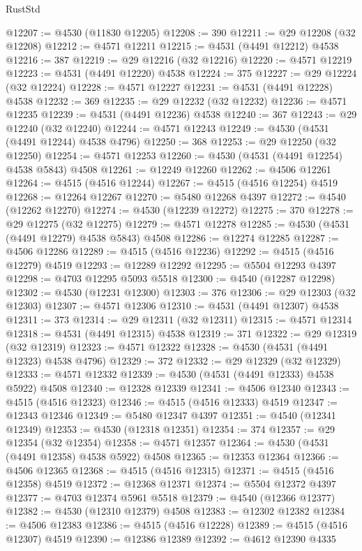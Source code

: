\begin{lexlean}{RustStd}
\begin{coremodule}
@12207 := @4530 (@11830 @12205)
@12208 := 390
@12211 := @29 @12208 (@32 @12208)
@12212 := @4571 @12211
@12215 := @4531 (@4491 @12212) @4538
@12216 := 387
@12219 := @29 @12216 (@32 @12216)
@12220 := @4571 @12219
@12223 := @4531 (@4491 @12220) @4538
@12224 := 375
@12227 := @29 @12224 (@32 @12224)
@12228 := @4571 @12227
@12231 := @4531 (@4491 @12228) @4538
@12232 := 369
@12235 := @29 @12232 (@32 @12232)
@12236 := @4571 @12235
@12239 := @4531 (@4491 @12236) @4538
@12240 := 367
@12243 := @29 @12240 (@32 @12240)
@12244 := @4571 @12243
@12249 := @4530 (@4531 (@4491 @12244) @4538 @4796)
@12250 := 368
@12253 := @29 @12250 (@32 @12250)
@12254 := @4571 @12253
@12260 := @4530 (@4531 (@4491 @12254) @4538 @5843) @4508
@12261 := @12249 @12260
@12262 := @4506 @12261
@12264 := @4515 (@4516 @12244)
@12267 := @4515 (@4516 @12254) @4519
@12268 := @12264 @12267
@12270 := @5480 @12268 @4397
@12272 := @4540 (@12262 @12270)
@12274 := @4530 (@12239 @12272)
@12275 := 370
@12278 := @29 @12275 (@32 @12275)
@12279 := @4571 @12278
@12285 := @4530 (@4531 (@4491 @12279) @4538 @5843) @4508
@12286 := @12274 @12285
@12287 := @4506 @12286
@12289 := @4515 (@4516 @12236)
@12292 := @4515 (@4516 @12279) @4519
@12293 := @12289 @12292
@12295 := @5504 @12293 @4397
@12298 := @4703 @12295 @5093 @5518
@12300 := @4540 (@12287 @12298)
@12302 := @4530 (@12231 @12300)
@12303 := 376
@12306 := @29 @12303 (@32 @12303)
@12307 := @4571 @12306
@12310 := @4531 (@4491 @12307) @4538
@12311 := 373
@12314 := @29 @12311 (@32 @12311)
@12315 := @4571 @12314
@12318 := @4531 (@4491 @12315) @4538
@12319 := 371
@12322 := @29 @12319 (@32 @12319)
@12323 := @4571 @12322
@12328 := @4530 (@4531 (@4491 @12323) @4538 @4796)
@12329 := 372
@12332 := @29 @12329 (@32 @12329)
@12333 := @4571 @12332
@12339 := @4530 (@4531 (@4491 @12333) @4538 @5922) @4508
@12340 := @12328 @12339
@12341 := @4506 @12340
@12343 := @4515 (@4516 @12323)
@12346 := @4515 (@4516 @12333) @4519
@12347 := @12343 @12346
@12349 := @5480 @12347 @4397
@12351 := @4540 (@12341 @12349)
@12353 := @4530 (@12318 @12351)
@12354 := 374
@12357 := @29 @12354 (@32 @12354)
@12358 := @4571 @12357
@12364 := @4530 (@4531 (@4491 @12358) @4538 @5922) @4508
@12365 := @12353 @12364
@12366 := @4506 @12365
@12368 := @4515 (@4516 @12315)
@12371 := @4515 (@4516 @12358) @4519
@12372 := @12368 @12371
@12374 := @5504 @12372 @4397
@12377 := @4703 @12374 @5961 @5518
@12379 := @4540 (@12366 @12377)
@12382 := @4530 (@12310 @12379) @4508
@12383 := @12302 @12382
@12384 := @4506 @12383
@12386 := @4515 (@4516 @12228)
@12389 := @4515 (@4516 @12307) @4519
@12390 := @12386 @12389
@12392 := @4612 @12390 @4335

\end{coremodule}
\end{lexlean}
